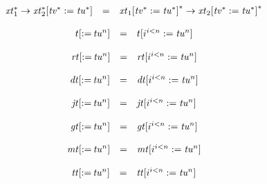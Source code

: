 $$
\begin{array}[t]{@{}lcl@{}l@{}}
{{{\mathit{xt}}_1^\ast} \rightarrow {{\mathit{xt}}_2^\ast}}{{}[ {{\mathit{tv}}^\ast} := {{\mathit{tu}}^\ast} ]} & = & {{{\mathit{xt}}_1}{{}[ {{\mathit{tv}}^\ast} := {{\mathit{tu}}^\ast} ]}^\ast} \rightarrow {{{\mathit{xt}}_2}{{}[ {{\mathit{tv}}^\ast} := {{\mathit{tu}}^\ast} ]}^\ast} \\
\end{array}
$$

\vspace{1ex}

$$
\begin{array}[t]{@{}lcl@{}l@{}}
{t}{{}[ {:=}\, {{\mathit{tu}}^{n}} ]} & = & {t}{{}[ {i^{i<n}} := {{\mathit{tu}}^{n}} ]} \\
\end{array}
$$

$$
\begin{array}[t]{@{}lcl@{}l@{}}
{{\mathit{rt}}}{{}[ {:=}\, {{\mathit{tu}}^{n}} ]} & = & {{\mathit{rt}}}{{}[ {i^{i<n}} := {{\mathit{tu}}^{n}} ]} \\
\end{array}
$$

$$
\begin{array}[t]{@{}lcl@{}l@{}}
{{\mathit{dt}}}{{}[ {:=}\, {{\mathit{tu}}^{n}} ]} & = & {{\mathit{dt}}}{{}[ {i^{i<n}} := {{\mathit{tu}}^{n}} ]} \\
\end{array}
$$

$$
\begin{array}[t]{@{}lcl@{}l@{}}
{{\mathit{jt}}}{{}[ {:=}\, {{\mathit{tu}}^{n}} ]} & = & {{\mathit{jt}}}{{}[ {i^{i<n}} := {{\mathit{tu}}^{n}} ]} \\
\end{array}
$$

$$
\begin{array}[t]{@{}lcl@{}l@{}}
{{\mathit{gt}}}{{}[ {:=}\, {{\mathit{tu}}^{n}} ]} & = & {{\mathit{gt}}}{{}[ {i^{i<n}} := {{\mathit{tu}}^{n}} ]} \\
\end{array}
$$

$$
\begin{array}[t]{@{}lcl@{}l@{}}
{{\mathit{mt}}}{{}[ {:=}\, {{\mathit{tu}}^{n}} ]} & = & {{\mathit{mt}}}{{}[ {i^{i<n}} := {{\mathit{tu}}^{n}} ]} \\
\end{array}
$$

$$
\begin{array}[t]{@{}lcl@{}l@{}}
{{\mathit{tt}}}{{}[ {:=}\, {{\mathit{tu}}^{n}} ]} & = & {{\mathit{tt}}}{{}[ {i^{i<n}} := {{\mathit{tu}}^{n}} ]} \\
\end{array}
$$

